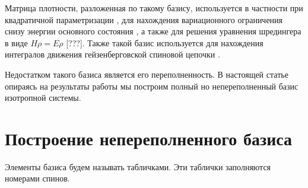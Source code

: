 \documentclass[]{article}
\renewcommand{\[}{\begin{equation}}
\renewcommand{\]}{\end{equation}}
\begin{document}
Матрица плотности, разложенная по такому базису, используется в частности при квадратичной параметризации \cite{kvadro},
для нахождения вариационного ограничения снизу энергии основного состояния \cite{variational}, 
а также для решения уравнения шредингера в виде $ H\rho = E\rho $ [???].
Также такой базис используется для нахождения интегралов движения гейзенберговской спиновой цепочки \cite{basisF}.

Недостатком такого базиса является его переполненность.
В настоящей статье опираясь на результаты работы \cite{sourceArticle}
мы построим полный но непереполненный базис изотропной системы.




\section{Построение непереполненного базиса \cite{sourceArticle}}
Элементы базиса будем называть табличками. Эти таблички заполняются номерами спинов.
\end{document}

